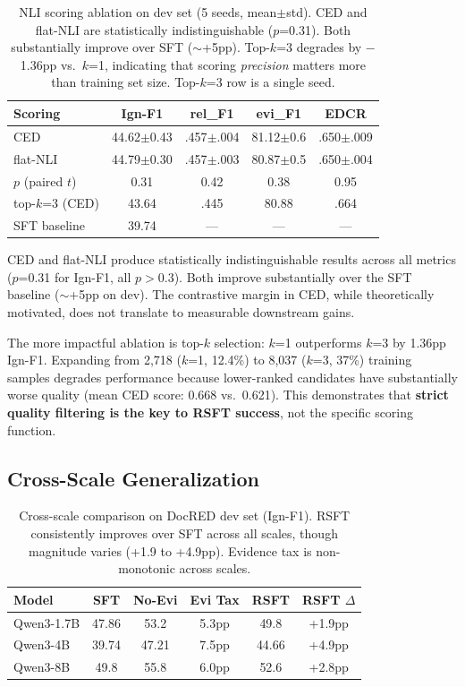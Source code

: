 \documentclass[11pt,a4paper]{article}
\begin{document}
\begin{table}[t]
\centering
\small
\begin{tabular}{lcccc}
\toprule
\textbf{Scoring} & \textbf{Ign-F1} & \textbf{rel\_F1} & \textbf{evi\_F1} & \textbf{EDCR} \\
\midrule
CED & 44.62$\pm$0.43 & .457$\pm$.004 & 81.12$\pm$0.6 & .650$\pm$.009 \\
flat-NLI & 44.79$\pm$0.30 & .457$\pm$.003 & 80.87$\pm$0.5 & .650$\pm$.004 \\
\midrule
$p$ (paired $t$) & 0.31 & 0.42 & 0.38 & 0.95 \\
\midrule
top-$k$=3 (CED) & 43.64 & .445 & 80.88 & .664 \\
SFT baseline & 39.74 & --- & --- & --- \\
\bottomrule
\end{tabular}
\caption{NLI scoring ablation on dev set (5 seeds, mean$\pm$std). CED and flat-NLI are statistically indistinguishable ($p$=0.31). Both substantially improve over SFT ($\sim$+5pp). Top-$k$=3 degrades by $-$1.36pp vs.\ $k$=1, indicating that scoring \emph{precision} matters more than training set size. Top-$k$=3 row is a single seed.}
\label{tab:scoring}
\end{table}

CED and flat-NLI produce statistically indistinguishable results across all metrics ($p$=0.31 for Ign-F1, all $p>0.3$). Both improve substantially over the SFT baseline ($\sim$+5pp on dev). The contrastive margin in CED, while theoretically motivated, does not translate to measurable downstream gains.

The more impactful ablation is top-$k$ selection: $k$=1 outperforms $k$=3 by 1.36pp Ign-F1. Expanding from 2,718 ($k$=1, 12.4\%) to 8,037 ($k$=3, 37\%) training samples degrades performance because lower-ranked candidates have substantially worse quality (mean CED score: 0.668 vs.\ 0.621). This demonstrates that \textbf{strict quality filtering is the key to RSFT success}, not the specific scoring function.

\subsection{Cross-Scale Generalization}
\label{sec:cross-scale}

\begin{table}[t]
\centering
\small
\begin{tabular}{lccccc}
\toprule
\textbf{Model} & \textbf{SFT} & \textbf{No-Evi} & \textbf{Evi Tax} & \textbf{RSFT} & \textbf{RSFT $\Delta$} \\
\midrule
Qwen3-1.7B & 47.86 & 53.2 & 5.3pp & 49.8 & +1.9pp \\
Qwen3-4B & 39.74 & 47.21 & 7.5pp & 44.66 & +4.9pp \\
Qwen3-8B & 49.8 & 55.8 & 6.0pp & 52.6 & +2.8pp \\
\bottomrule
\end{tabular}
\caption{Cross-scale comparison on DocRED dev set (Ign-F1). RSFT consistently improves over SFT across all scales, though magnitude varies (+1.9 to +4.9pp). Evidence tax is non-monotonic across scales.}
\label{tab:cross-scale}
\end{table}
\end{document}

